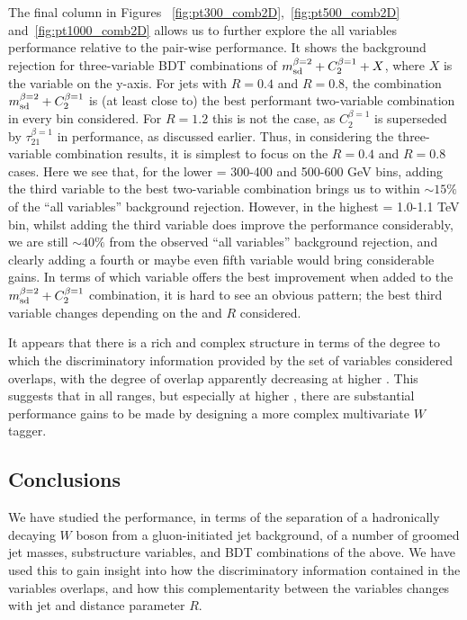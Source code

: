 The final column in Figures ~\ref{fig:pt300_comb2D},~\ref{fig:pt500_comb2D}
and~\ref{fig:pt1000_comb2D} allows us to further explore the all variables
performance relative to the pair-wise performance. It shows the background rejection for 
three-variable BDT combinations of $m_{\rm sd}^{\beta=2} + C_2^{\beta=1} +
X$, where $X$ is the variable on the y-axis. For jets with $R=0.4$ and
$R=0.8$, the combination $m_{\rm sd}^{\beta=2} + C_2^{\beta=1}$
is (at least close to) the best performant
two-variable combination in every \pT bin considered. For $R=1.2$ this
is not the case, as $C_2^{\beta=1}$ is superseded by
$\tau_{21}^{\beta=1}$ in performance, as discussed earlier. Thus, in
considering the three-variable combination results, it is simplest to focus
on the $R=0.4$ and $R=0.8$ cases. Here we see that, for the lower \pT =
300-400 and 500-600 GeV bins, adding the third variable to the best
two-variable combination brings us to within $\sim 15\%$ of the ``all
variables'' background rejection. However, in the highest \pT = 1.0-1.1 TeV bin, whilst adding the third
variable does improve the performance considerably, we are still $\sim
40\%$ from the observed ``all variables'' background rejection, and
clearly adding a fourth or maybe even fifth variable would bring
considerable gains. In terms of which variable offers the best
improvement when added to the $m_{\rm sd}^{\beta=2} + C_2^{\beta=1}$
combination, it is hard to see an obvious pattern; the best third
variable changes depending on the \pT and $R$ considered.

It appears that there is a rich and
complex structure in terms of the degree to which the discriminatory
information provided by the set of variables considered overlaps, with
the degree of overlap apparently decreasing at higher \pT. This
suggests that in all \pT ranges, but especially at higher \pT, there
are substantial performance gains to be made by designing a more
complex multivariate $W$ tagger.

\subsection{Conclusions}

We have studied the performance, in terms of the separation of a
hadronically decaying $W$ boson from a gluon-initiated jet
background, of a number of groomed jet masses, substructure variables,
and BDT combinations of the above. We have used this to gain insight into
 how the discriminatory information contained in the
variables overlaps, and how this complementarity between the variables
changes with jet \pT and \antikt distance parameter $R$. 

